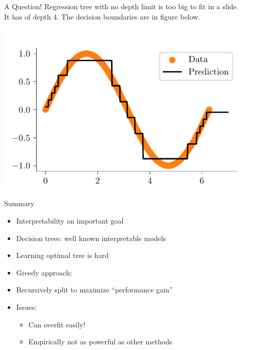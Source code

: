 \documentclass{beamer}
\begin{document}
\begin{frame}{A Question!}
Regression tree with no depth limit is too big to fit in a slide. \\
It has of depth 4. The decision boundaries are in figure below.\\
\begin{center}
\includegraphics{../figures/decision-trees/sine-depth-4.pdf}
\end{center}
\end{frame}

\begin{frame}{Summary}
\begin{itemize}
	\item Interpretability an important goal
\item Decision trees: well known interpretable models
\item  Learning optimal tree is hard
\item  Greedy approach:
\item  Recursively split to maximize “performance gain”
\item  Issues:
\begin{itemize}
	\item Can overfit easily!
	\item  Empirically not as powerful as other methods
\end{itemize}
\end{itemize}

\end{frame}
\end{document}
